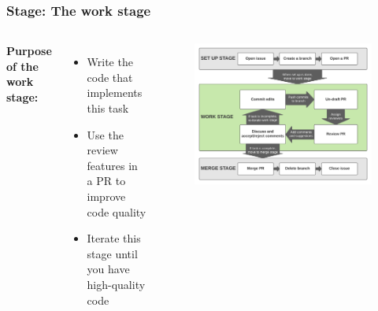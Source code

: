 \documentclass[aspectratio=169]{beamer} %
\begin{document}
\begin{frame}
	\frametitle{Stage: The work stage}
	\begin{columns}[c]


		\Large \textbf{Purpose of the work stage:}
		\vspace{.5em}
		\normalsize
		\begin{itemize}
			\setlength\itemsep{.5em}
			\item Write the code that implements this task
			\item Use the review features in a PR to improve code quality
			\item Iterate this stage until you have high-quality code
		\end{itemize}

		\vspace{-.75cm}
		\begin{figure}
			\centering
			\includegraphics[width=\textwidth]{./img/branch-pr-merge-cycle-S2.png}
		\end{figure}

	\end{columns}
\end{frame}
\end{document}
